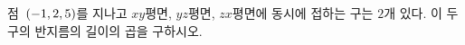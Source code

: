 점~$(-1{,}\mkern3mu\mathopen{}2{,}\mkern3mu\mathopen{}5)$를 지나고 $xy$평면, $yz$평면, $zx$평면에 동시에 접하는 구는 $2$개 있다. 이 두 구의 반지름의 길이의 곱을 구하시오.
